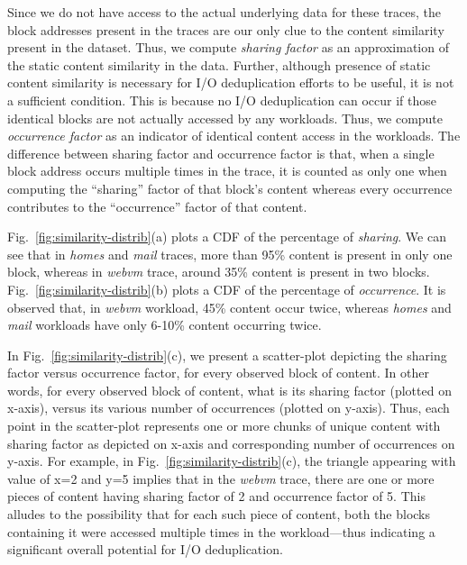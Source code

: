 Since we do not have access to the actual underlying data for these traces, 
the block addresses present in the traces are our only clue to the content similarity 
present in the dataset. Thus, we compute \textit{sharing factor} as an approximation 
of the static content similarity in the data. 
Further, although presence of static content similarity is necessary for I/O 
deduplication efforts to be useful, it is not a sufficient condition. This is 
because no I/O deduplication can occur if those identical blocks are not actually 
accessed by any workloads. Thus, we compute \textit{occurrence factor} as an indicator 
of identical content access in the workloads.
The difference between sharing factor and occurrence factor is that, 
when a single block address occurs multiple times in the trace, it is counted as 
only one when computing the ``sharing'' factor of that block’s content whereas 
every occurrence contributes to the ``occurrence'' factor of that content. 


Fig.~\ref{fig:similarity-distrib}(a) plots a CDF of the percentage of \textit{sharing}.
We can see that in \textit{homes} and
\textit{mail} traces, more than 95\% content is present in only one block, whereas
in \textit{webvm} trace, around 35\% content is present in two blocks.
Fig.~\ref{fig:similarity-distrib}(b) plots a CDF of the percentage of \textit{occurrence}.
It is observed that,
in \textit{webvm} workload, 45\% content occur twice,
whereas \textit{homes} and \textit{mail} workloads have only 6-10\% content
occurring twice.

In Fig.~\ref{fig:similarity-distrib}(c), we present a scatter-plot depicting
the sharing factor versus occurrence factor, for every observed block of content.
In other words, for every observed block of content, 
what is its sharing factor (plotted on x-axis), 
versus its various number of occurrences (plotted on y-axis).
Thus, each point in the scatter-plot represents one or more chunks of unique
content with sharing factor as depicted on x-axis and corresponding
number of occurrences on y-axis. For example, in Fig.~\ref{fig:similarity-distrib}(c),
the triangle appearing with value of x=2 and y=5 implies that in the 
\textit{webvm} trace, there are one or more pieces of content having
sharing factor of 2 and occurrence factor of 5. This alludes to the possibility
that for each such piece of content, both the blocks containing it 
were accessed multiple times in the workload---thus
indicating a significant overall potential for I/O deduplication.

